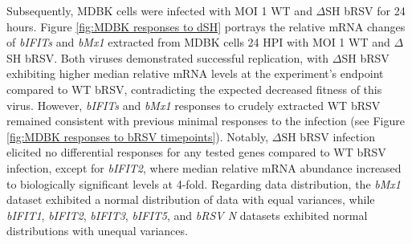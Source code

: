 Subsequently, MDBK cells were infected with MOI 1 WT and \(\Delta\)SH bRSV for 24 hours. Figure \ref{fig:MDBK responses to dSH} portrays the relative mRNA changes of \textit{bIFITs} and \textit{bMx1} extracted from MDBK cells 24 HPI with MOI 1 WT and \(\Delta\)SH bRSV. Both viruses demonstrated successful replication, with \(\Delta\)SH bRSV exhibiting higher median relative mRNA levels at the experiment's endpoint compared to WT bRSV, contradicting the expected decreased fitness of this virus. However, \textit{bIFITs} and \textit{bMx1} responses to crudely extracted WT bRSV remained consistent with previous minimal responses to the infection (see Figure \ref{fig:MDBK responses to bRSV timepoints}). Notably, \(\Delta\)SH bRSV infection elicited no differential responses for any tested genes compared to WT bRSV infection, except for \textit{bIFIT2}, where median relative mRNA abundance increased to biologically significant levels at 4-fold. Regarding data distribution, the \textit{bMx1} dataset exhibited a normal distribution of data with equal variances, while \textit{bIFIT1}, \textit{bIFIT2}, \textit{bIFIT3}, \textit{bIFIT5}, and \textit{bRSV N} datasets exhibited normal distributions with unequal variances.


